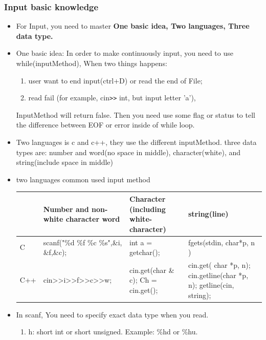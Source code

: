 \documentclass[a4paper,12pt,twoside]{book}
\begin{document}
\subsubsection{Input basic knowledge}

\begin{itemize}
\item For Input, you need to master \textbf{One basic idea, Two languages, Three data type.}
\item One basic idea: In order to make continuously input, you need to use while(inputMethod), When two things happens:
\begin{enumerate}
\item user want to end input(ctrl+D) or read the end of File;
\item read fail (for example,  cin\verb=>>= int, but input letter 'a'),
\end{enumerate}

InputMethod will return false.  Then you need use some flag or status to tell the difference between EOF or error inside of while loop.

\item Two languages is c and c++, they use the different inputMethod. three data types are: number and word(no space in middle), character(white), and string(include space in middle)

\item two languages common used input method \\
\begin{tabular}{|p{}|p{}|p{}|p{}|}
\hline
& Number and non-white  character word & Character (including white-character) & string(line)\\
\hline
C &scanf("\%d \%f \%c \%s",\&i, \&f,\&c);  & int a = getchar(); & fgets(stdin, char*p, n ) \\
\hline
C++ & cin>>i>>f>>c>>w; & cin.get(char \& c); \newline  Ch = cin.get(); & cin.get( char *p, n); \newline cin.getline(char *p, n); \newline getline(cin, string);
 \\
\hline
\end{tabular}


\item In scanf, You need to specify exact data type when you read.
\begin{enumerate}
\item h:  short int or short unsigned. Example: \%hd or \%hu.


\end{enumerate}
\end{itemize}
\end{document}
